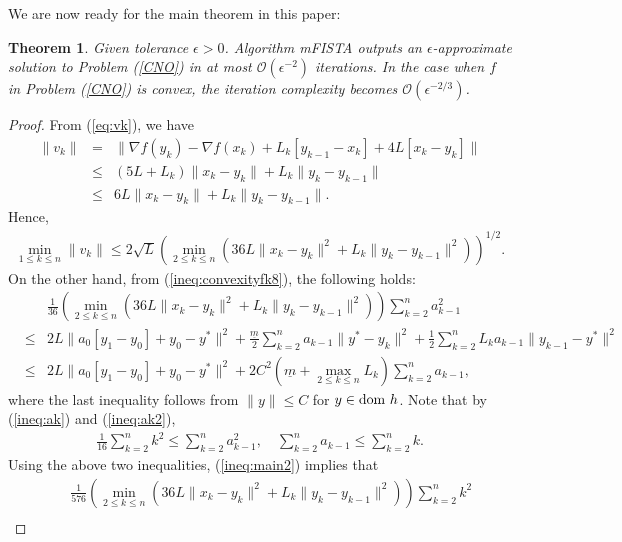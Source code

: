 \documentclass[11pt]{article}
\newtheorem{theorem}[thm]{Theorem}
\begin{document}
\noindent We are now ready for the main theorem in this paper:
\begin{theorem}\label{thm:main}
Given tolerance $\epsilon > 0$.  Algorithm mFISTA outputs an $\epsilon$-approximate solution to Problem (\ref{CNO}) in at most $\mathcal{O}(\epsilon^{-2})$ iterations.  In the case when $f$ in Problem (\ref{CNO}) is convex, the iteration complexity becomes $\mathcal{O}(\epsilon^{-2/3})$.   
\end{theorem}
\begin{proof}
From (\ref{eq:vk}), we have
\begin{eqnarray*}
\| v_{k} \| & =  & \| \nabla f(y_{k}) - \nabla f(x_{k}) + L_k[y_{k-1} - x_{k}] +  4L [{x}_{k} - y_{k}] \| \\
& \leq & (5L + L_k) \| x_k - y_k \| + L_k \| y_k - y_{k-1} \| \\
& \leq & 6L \| x_k - y_k \| + L_k \| y_k - y_{k-1} \|.
\end{eqnarray*}
Hence,
\begin{eqnarray}\label{ineq:main}
\min_{1 \leq k \leq n} \| v_k \| \leq 2 \sqrt{L}  \left( \min_{2 \leq k \leq n} \left( 36L \| x_k - y_k \|^2 + L_k \| y_k - y_{k-1} \|^2  \right) \right)^{1/2}.
\end{eqnarray} 
On the other hand, from (\ref{ineq:convexityfk8}), the following holds:
\begin{eqnarray}
&  & \frac{1}{36} \left( \min_{2 \leq k \leq n}  \left( 36L \| x_k - y_k \|^2 + L_k \| y_k - y_{k-1} \|^2 \right) \right) \sum_{k=2}^{n} a_{k-1}^2  \nonumber \\
& \leq &  2 L \|a_{0}[ y_{1} - y_{0}]  + y_{0} - y^\ast \|^2 + \frac{\underline{m}}{2} \sum_{k=2}^n a_{k-1} \| y^\ast - y_{k} \|^2 + \frac{1}{2} \sum_{k=2}^n L_k a_{k-1} \| y_{k-1} - y^\ast \|^2 \nonumber \\
& \leq & 2 L\|a_{0}[ y_{1} - y_{0}]  + y_{0} - y^\ast \|^2 + 2C^2\left( \underline{m} +  \max_{2 \leq k \leq n} L_k \right) \sum_{k=2}^n a_{k-1}, \label{ineq:main2}
\end{eqnarray}
where the last inequality follows from $\| y \| \leq C$ for $y \in {\rm{dom}}\ h$.  Note that by (\ref{ineq:ak}) and (\ref{ineq:ak2}),
\begin{eqnarray*}
\frac{1}{16} \sum_{k=2}^n k^2 \leq  \sum_{k=2}^{n} a_{k-1}^2 , \quad \sum_{k=2}^n a_{k-1} \leq \sum_{k=2}^n k.
\end{eqnarray*}
Using the above two inequalities, (\ref{ineq:main2}) implies that
\begin{eqnarray}
&  & \frac{1}{576}  \left(\min_{2 \leq k \leq n} \left(36L \| x_k - y_k \|^2 + L_k \| y_k - y_{k-1} \|^2 \right)\right) \sum_{k=2}^{n} k^2 \nonumber \\

\end{eqnarray}
\end{proof}
\end{document}
